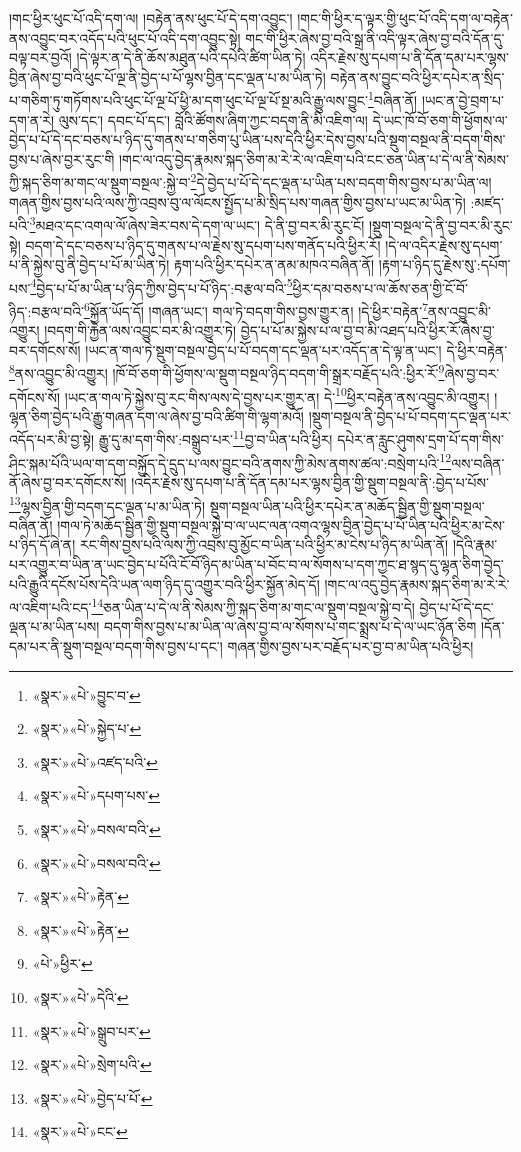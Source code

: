 །གང་ཕྱིར་ཕུང་པོ་འདི་དག་ལ། །བརྟེན་ནས་ཕུང་པོ་དེ་དག་འབྱུང་། །གང་གི་ཕྱིར་ད་ལྟར་གྱི་ཕུང་པོ་འདི་དག་ལ་བརྟེན་ནས་འབྱུང་བར་འདོད་པའི་ཕུང་པོ་འདི་དག་འབྱུང་སྟེ། གང་གི་ཕྱིར་ཞེས་བྱ་བའི་སྒྲ་ནི་འདི་ལྟར་ཞེས་བྱ་བའི་དོན་དུ་བལྟ་བར་བྱའོ། །དེ་ལྟར་ན་དེ་ནི་ཆོས་མཐུན་པའི་དཔེའི་ཚིག་ཡིན་ཏེ། འདིར་རྗེས་སུ་དཔག་པ་ནི་དོན་དམ་པར་ལྷས་བྱིན་ཞེས་བྱ་བའི་ཕུང་པོ་ལྔ་ནི་བྱེད་པ་པོ་ལྷས་བྱིན་དང་ལྡན་པ་མ་ཡིན་ཏེ། བརྟེན་ནས་བྱུང་བའི་ཕྱིར་དཔེར་ན་སྲིད་པ་གཅིག་ཏུ་གཏོགས་པའི་ཕུང་པོ་ལྔ་པོ་ཕྱི་མ་དག་ཕུང་པོ་ལྔ་པོ་སྔ་མའི་རྒྱུ་ལས་བྱུང་\footnote{«སྣར་»«པེ་»བྱུང་བ་}བཞིན་ནོ། །ཡང་ན་བྱེ་བྲག་པ་དག་ན་རེ། ལུས་དང་། དབང་པོ་དང་། བློའི་ཚོགས་ཞིག་ཀྱང་བདག་ནི་མི་འཇིག་ལ། དེ་ཡང་ཁོ་བོ་ཅག་གི་ཕྱོགས་ལ་བྱེད་པ་པོ་དེ་དང་བཅས་པ་ཉིད་དུ་གནས་པ་གཅིག་པུ་ཡིན་པས་དེའི་ཕྱིར་དེས་བྱས་པའི་སྡུག་བསྔལ་ནི་བདག་གིས་བྱས་པ་ཞེས་བྱར་རུང་གི །གང་ལ་འདུ་བྱེད་རྣམས་སྐད་ཅིག་མ་རེ་རེ་ལ་འཇིག་པའི་ངང་ཅན་ཡིན་པ་དེ་ལ་ནི་སེམས་ཀྱི་སྐད་ཅིག་མ་གང་ལ་སྡུག་བསྔལ་:སྐྱེ་བ་\footnote{«སྣར་»«པེ་»སྐྱེད་པ་}དེ་བྱེད་པ་པོ་དེ་དང་ལྡན་པ་ཡིན་པས་བདག་གིས་བྱས་པ་མ་ཡིན་ལ། གཞན་གྱིས་བྱས་པའི་ལས་ཀྱི་འབྲས་བུ་ལ་ལོངས་སྤྱོད་པ་མི་སྲིད་པས་གཞན་གྱིས་བྱས་པ་ཡང་མ་ཡིན་ཏེ། :མཛད་པའི་\footnote{«སྣར་»«པེ་»འཛད་པའི་}མཐའ་དང་འགལ་ལོ་ཞེས་ཟེར་བས་དེ་དག་ལ་ཡང་། དེ་ནི་བྱ་བར་མི་རུང་ངོ། །སྡུག་བསྔལ་དེ་ནི་བྱ་བར་མི་རུང་སྟེ། བདག་དེ་དང་བཅས་པ་ཉིད་དུ་གནས་པ་ལ་རྗེས་སུ་དཔག་པས་གནོད་པའི་ཕྱིར་རོ། །དེ་ལ་འདིར་རྗེས་སུ་དཔག་པ་ནི་སྐྱེས་བུ་ནི་བྱེད་པ་པོ་མ་ཡིན་ཏེ། རྟག་པའི་ཕྱིར་དཔེར་ན་ནམ་མཁའ་བཞིན་ནོ། །རྟག་པ་ཉིད་དུ་རྗེས་སུ་:དཔོག་པས་\footnote{«སྣར་»«པེ་»དཔག་པས་}བྱེད་པ་པོ་མ་ཡིན་པ་ཉིད་ཀྱིས་བྱེད་པ་པོ་ཉིད་:བརྩལ་བའི་\footnote{«སྣར་»«པེ་»བསལ་བའི་}ཕྱིར་དམ་བཅས་པ་ལ་ཆོས་ཅན་གྱི་ངོ་བོ་ཉིད་:བརྩལ་བའི་\footnote{«སྣར་»«པེ་»བསལ་བའི་}སྐྱོན་ཡོད་དོ། །གཞན་ཡང་། གལ་ཏེ་བདག་གིས་བྱས་གྱུར་ན། །དེ་ཕྱིར་བརྟེན་\footnote{«སྣར་»«པེ་»རྟེན་}ནས་འབྱུང་མི་འགྱུར། །བདག་གི་རྐྱེན་ལས་འབྱུང་བར་མི་འགྱུར་ཏེ། བྱེད་པ་པོ་མ་སྐྱེས་པ་ལ་བྱ་བ་མི་འཐད་པའི་ཕྱིར་རོ་ཞེས་བྱ་བར་དགོངས་སོ། །ཡང་ན་གལ་ཏེ་སྡུག་བསྔལ་བྱེད་པ་པོ་བདག་དང་ལྡན་པར་འདོད་ན་དེ་ལྟ་ན་ཡང་། དེ་ཕྱིར་བརྟེན་\footnote{«སྣར་»«པེ་»རྟེན་}ནས་འབྱུང་མི་འགྱུར། །ཁོ་བོ་ཅག་གི་ཕྱོགས་ལ་སྡུག་བསྔལ་ཉིད་བདག་གི་སྒྲར་བརྗོད་པའི་:ཕྱིར་རོ་\footnote{«པེ་»ཕྱིར་}ཞེས་བྱ་བར་དགོངས་སོ། །ཡང་ན་གལ་ཏེ་སྐྱེས་བུ་རང་གིས་ལས་དེ་བྱས་པར་གྱུར་ན། དེ་\footnote{«སྣར་»«པེ་»དེའི་}ཕྱིར་བརྟེན་ནས་འབྱུང་མི་འགྱུར། །ལྷན་ཅིག་བྱེད་པའི་རྒྱུ་གཞན་དག་ལ་ཞེས་བྱ་བའི་ཚིག་གི་ལྷག་མའོ། །སྡུག་བསྔལ་ནི་བྱེད་པ་པོ་བདག་དང་ལྡན་པར་འདོད་པར་མི་བྱ་སྟེ། རྒྱུ་དུ་མ་དག་གིས་:བསྒྲུབ་པར་\footnote{«སྣར་»«པེ་»སྒྲུབ་པར་}བྱ་བ་ཡིན་པའི་ཕྱིར། དཔེར་ན་རླུང་ཤུགས་དྲག་པོ་དག་གིས་ཤིང་སྐམ་པོའི་ཡལ་ག་དག་བསྐྱོད་དེ་དྲུད་པ་ལས་བྱུང་བའི་ནགས་ཀྱི་མེས་ནགས་ཚལ་:བསྲེག་པའི་\footnote{«སྣར་»«པེ་»སྲེག་པའི་}ལས་བཞིན་ནོ་ཞེས་བྱ་བར་དགོངས་སོ། །འདིར་རྗེས་སུ་དཔག་པ་ནི་དོན་དམ་པར་ལྷས་བྱིན་གྱི་སྡུག་བསྔལ་ནི་:བྱེད་པ་པོས་\footnote{«སྣར་»«པེ་»བྱེད་པ་པོ་}ལྷས་བྱིན་གྱི་བདག་དང་ལྡན་པ་མ་ཡིན་ཏེ། སྡུག་བསྔལ་ཡིན་པའི་ཕྱིར་དཔེར་ན་མཆོད་སྦྱིན་གྱི་སྡུག་བསྔལ་བཞིན་ནོ། །གལ་ཏེ་མཆོད་སྦྱིན་གྱི་སྡུག་བསྔལ་སྐྱེ་བ་ལ་ཡང་ལན་འགའ་ལྷས་བྱིན་བྱེད་པ་པོ་ཡིན་པའི་ཕྱིར་མ་ངེས་པ་ཉིད་དོ་ཞེ་ན། རང་གིས་བྱས་པའི་ལས་ཀྱི་འབྲས་བུ་མྱོང་བ་ཡིན་པའི་ཕྱིར་མ་ངེས་པ་ཉིད་མ་ཡིན་ནོ། །དེའི་རྣམ་པར་འགྱུར་བ་ཡིན་ན་ཡང་བྱེད་པ་པོའི་ངོ་བོ་ཉིད་མ་ཡིན་པ་བོང་བ་ལ་སོགས་པ་དག་ཀྱང་ཐ་སྙད་དུ་ལྷན་ཅིག་བྱེད་པའི་རྒྱུའི་དངོས་པོས་དེའི་ཡན་ལག་ཉིད་དུ་འགྱུར་བའི་ཕྱིར་སྐྱོན་མེད་དོ། །གང་ལ་འདུ་བྱེད་རྣམས་སྐད་ཅིག་མ་རེ་རེ་ལ་འཇིག་པའི་ངད་\footnote{«སྣར་»«པེ་»ངང་}ཅན་ཡིན་པ་དེ་ལ་ནི་སེམས་ཀྱི་སྐད་ཅིག་མ་གང་ལ་སྡུག་བསྔལ་སྐྱེ་བ་དེ། བྱེད་པ་པོ་དེ་དང་ལྡན་པ་མ་ཡིན་པས། བདག་གིས་བྱས་པ་མ་ཡིན་ལ་ཞེས་བྱ་བ་ལ་སོགས་པ་གང་སྨྲས་པ་དེ་ལ་ཡང་ཉོན་ཅིག །དོན་དམ་པར་ནི་སྡུག་བསྔལ་བདག་གིས་བྱས་པ་དང་། གཞན་གྱིས་བྱས་པར་བརྗོད་པར་བྱ་བ་མ་ཡིན་པའི་ཕྱིར། 